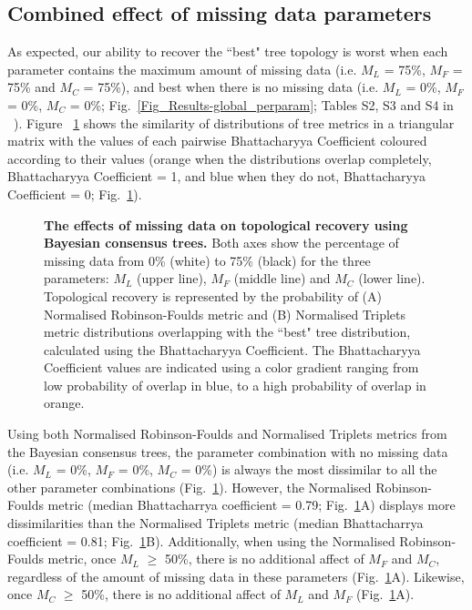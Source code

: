 \documentclass[10pt,letterpaper]{article}
\begin{document}
\subsection*{Combined effect of missing data parameters}
As expected, our ability to recover the ``best" tree topology is worst when each parameter contains the maximum amount of missing data (i.e. $M_{L}$ = 75\%, $M_{F}$ = 75\% and $M_{C}$ = 75\%), and best when there is no missing data (i.e. $M_{L}$ = 0\%, $M_{F}$ = 0\%, $M_{C}$ = 0\%; Fig.~\ref{Fig_Results-global_perparam}; Tables S2, S3 and S4 in ~). Figure ~\ref{Fig_Results-paircomp_within} shows the similarity of distributions of tree metrics in a triangular matrix with the values of each pairwise Bhattacharyya Coefficient coloured according to their values (orange when the distributions overlap completely, Bhattacharyya Coefficient = 1, and blue when they do not, Bhattacharyya Coefficient = 0; Fig.~\ref{Fig_Results-paircomp_within}). 

\begin{figure}[]
\caption{{\bf The effects of missing data on topological recovery using Bayesian consensus trees.}
 Both axes show the percentage of missing data from 0\% (white) to 75\% (black) for the three parameters: $M_{L}$ (upper line), $M_{F}$ (middle line) and $M_{C}$ (lower line). Topological recovery is represented by the probability of (A) Normalised Robinson-Foulds metric and (B) Normalised Triplets metric distributions overlapping with the ``best" tree distribution, calculated using the Bhattacharyya Coefficient. The Bhattacharyya Coefficient values are indicated using a color gradient ranging from low probability of overlap in blue, to a high probability of overlap in orange.
}
\label{Fig_Results-paircomp_within}
\end{figure}

Using both Normalised Robinson-Foulds and Normalised Triplets metrics from the Bayesian consensus trees, the parameter combination with no missing data (i.e. $M_{L}$ = 0\%, $M_{F}$ = 0\%, $M_{C}$ = 0\%) is always the most dissimilar to all the other parameter combinations (Fig.~\ref{Fig_Results-paircomp_within}). However, the Normalised Robinson-Foulds metric (median Bhattacharrya coefficient = 0.79; Fig.~\ref{Fig_Results-paircomp_within}A) displays more dissimilarities than the Normalised Triplets metric (median Bhattacharrya coefficient = 0.81; Fig.~\ref{Fig_Results-paircomp_within}B). Additionally, when using the Normalised Robinson-Foulds metric, once $M_{L}$ $\geq$ 50\%, there is no additional affect of $M_{F}$ and $M_{C}$, regardless of the amount of missing data in these parameters (Fig.~\ref{Fig_Results-paircomp_within}A). Likewise, once $M_{C}$ $\geq$ 50\%, there is no additional affect of $M_{L}$ and $M_{F}$ (Fig.~\ref{Fig_Results-paircomp_within}A).
\end{document}
